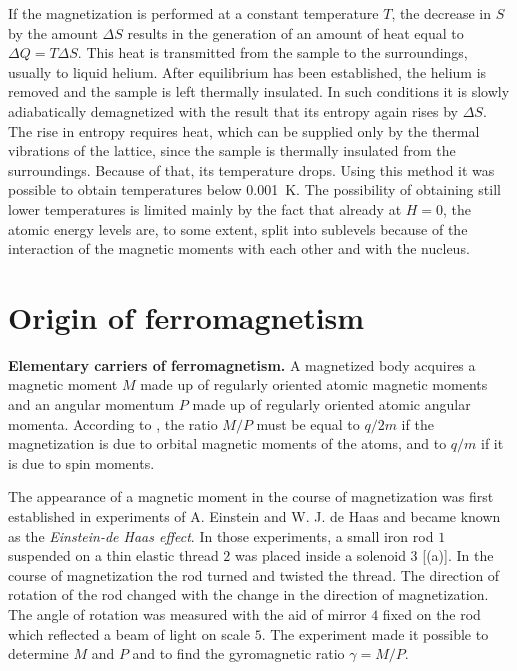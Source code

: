 \noindent
If the magnetization is performed at a constant temperature $T$, the decrease in $S$ by the amount $\Delta{S}$ results in the generation of an amount of heat equal to $\Delta{Q}=T\Delta{S}$. This heat is transmitted from the sample to the surroundings, usually to liquid helium. After equilibrium has been established, the helium is removed and the sample is left thermally insulated. In such conditions it is slowly adiabatically demagnetized with the result that its entropy again rises by $\Delta{S}$. The rise in entropy requires heat, which can be supplied only by the thermal vibrations of the lattice, since the sample is thermally insulated from the surroundings. Because of that, its temperature drops. Using this method it was possible to obtain temperatures below \SI{0.001}{\kelvin}. The possibility of obtaining still lower temperatures is limited mainly by the fact that already at $H=0$, the atomic energy levels are, to some extent, split into sublevels because of the interaction of the magnetic moments with each other and with the nucleus.

\section{Origin of ferromagnetism}\label{sec:68}

\textbf{Elementary carriers of ferromagnetism.} A magnetized body acquires a magnetic moment $M$ made up of regularly oriented atomic magnetic moments and an angular momentum $P$ made up of regularly oriented atomic angular momenta. According to , the ratio $M/P$ must be equal to $q/2m$ if the magnetization is due to orbital magnetic moments of the atoms, and to $q/m$ if it is due to spin moments.

The appearance of a magnetic moment in the course of magnetization was first established in experiments of A. Einstein and W. J. de Haas and became known as the \textit{Einstein-de Haas effect}. In those experiments, a small iron rod $1$ suspended on a thin elastic thread $2$ was placed inside a solenoid $3$ [(a)]. In the course of magnetization the rod turned and twisted the thread. The direction of rotation of the rod changed with the change in the direction of magnetization. The angle of rotation was measured with the aid of mirror $4$ fixed on the rod which reflected a beam of light on scale $5$. The experiment made it possible to determine $M$ and $P$ and to find the gyromagnetic ratio $\gamma=M/P$.


